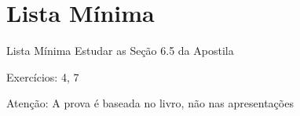 
\section{Lista Mínima}

\begin{frame}{Lista Mínima}
  Estudar as Seção 6.5 da Apostila

  \vspace{\baselineskip}
  Exercícios: 4, 7

  \vfill
  Atenção: A prova é baseada no livro, não nas apresentações
\end{frame}


